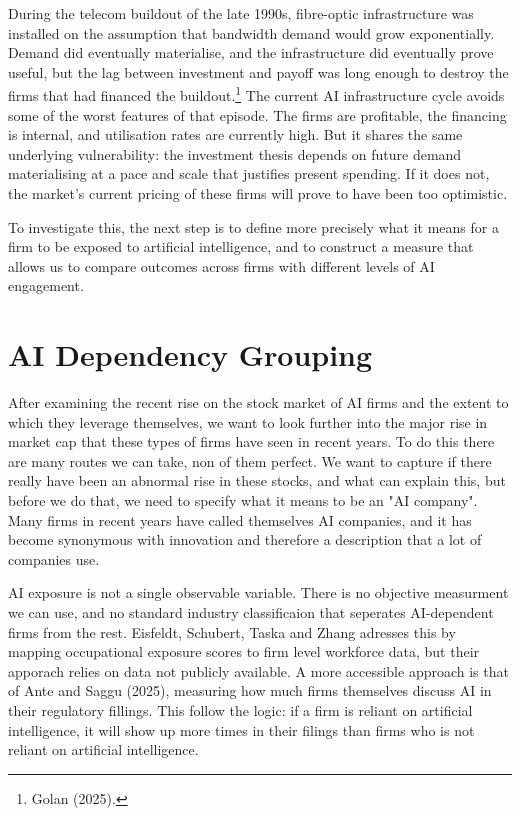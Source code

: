 \documentclass[12pt,a4paper]{article}
\begin{document}
During the telecom buildout of the late 1990s, fibre-optic infrastructure was installed on the assumption that bandwidth demand would grow exponentially. Demand did eventually materialise, and the infrastructure did eventually prove useful, but the lag between investment and payoff was long enough to destroy the firms that had financed the buildout.\footnote{Golan (2025).} The current AI infrastructure cycle avoids some of the worst features of that episode. The firms are profitable, the financing is internal, and utilisation rates are currently high. But it shares the same underlying vulnerability: the investment thesis depends on future demand materialising at a pace and scale that justifies present spending. If it does not, the market's current pricing of these firms will prove to have been too optimistic.

To investigate this, the next step is to define more precisely what it means for a firm to be exposed to artificial intelligence, and to construct a measure that allows us to compare outcomes across firms with different levels of AI engagement.

\section*{AI Dependency Grouping}

After examining the recent rise on the stock market of AI firms and the extent to which they leverage themselves, we want to look further into the major rise in market cap that these types of firms have seen in recent years. To do this there are many routes we can take, non of them perfect. We want to capture if there really have been an abnormal rise in these stocks, and what can explain this, but before we do that, we need to specify what it means to be an "AI company". Many firms in recent years have called themselves AI companies, and it has become synonymous with innovation and therefore a description that a lot of companies use. 

AI exposure is not a single observable variable. There is no objective measurment we can use, and no standard industry classificaion that seperates AI-dependent firms from the rest. Eisfeldt, Schubert, Taska and Zhang adresses this by mapping occupational exposure scores to firm level workforce data, but their apporach relies on data not publicly available. A more accessible approach is that of Ante and Saggu (2025), measuring how much firms themselves discuss AI in their regulatory fillings. This follow the logic: if a firm is reliant on artificial intelligence, it will show up more times in their filings than firms who is not reliant on artificial intelligence. 
\end{document}
